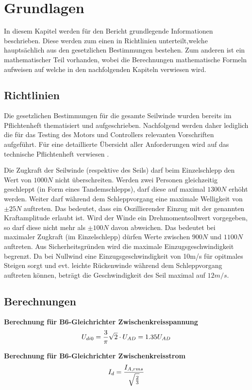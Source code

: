 \section{Grundlagen}\label{sec:Grundlagen}
In diesem Kapitel werden für den Bericht grundlegende Informationen beschrieben. Diese werden zum einen in Richtlinien unterteilt,welche hauptsächlich aus den gesetzlichen Bestimmungen bestehen. Zum anderen ist ein mathematischer Teil vorhanden, wobei die Berechnungen mathematische Formeln aufweisen auf welche in den nachfolgenden Kapiteln verwiesen wird. 

\subsection{Richtlinien}\label{subsec:Richtlinien}
Die gesetzlichen Bestimmungen für die gesamte Seilwinde wurden bereits im Pflichtenheft thematisiert und aufgeschrieben. Nachfolgend werden daher lediglich die für das Testing des Motors und Controllers relevanten Vorschriften aufgeführt. Für eine detaillierte Übersicht aller Anforderungen wird auf das technische Pflichtenheft verwiesen \cite{TechPflichtenheft}.

Die Zugkraft der Seilwinde (respektive des Seils) darf beim Einzelschlepp den Wert von $ 1000N $ nicht überschreiten. Werden zwei Personen gleichzeitig geschleppt (in Form eines Tandemschlepps), darf diese auf maximal $ 1300N $ erhöht werden. Weiter darf während dem Schleppvorgang eine maximale Welligkeit von $\pm 25N$ auftreten. Das bedeutet, dass ein Oszillierender Einzug mit der genannten Kraftamplitude erlaubt ist. Wird der Winde ein Drehmomentsollwert vorgegeben, so darf diese nicht mehr als $\pm 100N$ davon abweichen. Das bedeutet bei maximaler Zugkraft (im Einzelschlepp) dürfen Werte zwischen $ 900N $ und $ 1100N $ auftreten. Aus Sicherheitsgründen wird die maximale Einzugsgeschwindigkeit begrenzt. Da bei Nullwind eine Einzugsgeschwindigkeit von 10m/s für opitmales Steigen sorgt und evt. leichte Rückenwinde während dem Schleppvorgang auftreten können, beträgt die Geschwindigkeit des Seil maximal auf $ 12m/s $.



\subsection{Berechnungen}\label{subsec:Berechnungen}


\textbf{Berechnung für B6-Gleichrichter Zwischenkreisspannung}
\begin{equation}
\centering
U_{di0}=\frac{3}{\pi}\sqrt{2}\cdot U_{AD}=1.35U_{AD}
\label{eq:B6-Ud}
\end{equation}

\textbf{Berechnung für B6-Gleichrichter Zwischenkreisstrom}
\begin{equation}
\centering
I_{d}=\frac{I_{A,rms}}{\sqrt{\frac{2}{3}}}
\label{eq:B6-Id}
\end{equation}